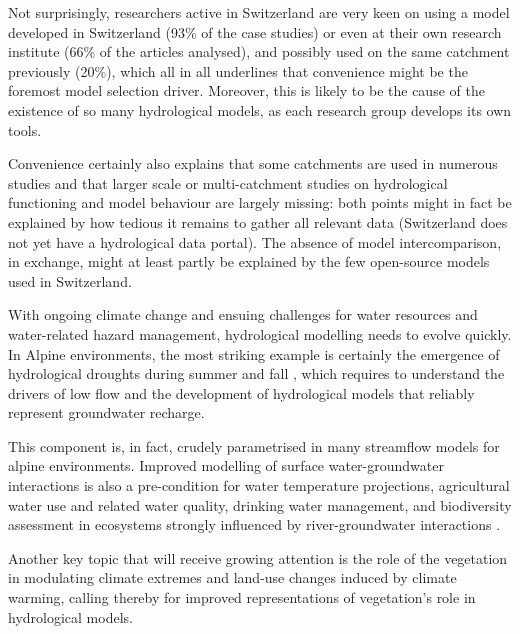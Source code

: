 \documentclass[10pt,a4paper]{article}
\begin{document}
Not surprisingly, researchers active in Switzerland are very keen on
using a model developed in Switzerland (93\% of the case studies) or
even at their own research institute (66\% of the articles analysed),
and possibly used on the same catchment previously (20\%), which all in
all underlines that convenience might be the foremost model selection
driver. Moreover, this is likely to be the cause of the existence of so
many hydrological models, as each research group develops its own tools.

Convenience certainly also explains that some catchments are used in
numerous studies and that larger scale or multi-catchment studies on
hydrological functioning and model behaviour are largely missing: both
points might in fact be explained by how tedious it remains to gather
all relevant data (Switzerland does not yet have a hydrological data
portal). The absence of model intercomparison, in exchange, might at
least partly be explained by the few open-source models used in
Switzerland. 

With ongoing climate change and ensuing challenges for water resources
and water-related hazard management, hydrological modelling needs to
evolve quickly. In Alpine environments, the most striking example is
certainly the emergence of hydrological droughts \citep{Van_Loon_2015}
during summer and fall \citep{brunner2019drought,Rigling2020}, which requires to understand
the drivers of low flow \citep{Arnoux_2020} and the development of
hydrological models that reliably represent groundwater recharge.

This component is, in fact, crudely parametrised in many streamflow
models for alpine environments. Improved modelling of surface
water-groundwater interactions is also a pre-condition for water
temperature projections, agricultural water use and related water
quality, drinking water management, and biodiversity assessment in
ecosystems strongly influenced by river-groundwater
interactions \citep{Brunner_2017}. 

Another key topic that will receive growing attention is the role of the
vegetation in modulating climate extremes \citep{Mastrotheodoros_2020} and
land-use changes induced by climate warming, calling thereby for
improved representations of vegetation's role in hydrological models.
\end{document}
